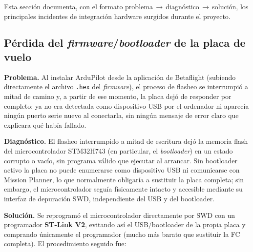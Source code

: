 Esta sección documenta, con el formato problema\,$\rightarrow$\,diagnóstico\,$\rightarrow$\,solución, los principales incidentes de integración hardware surgidos durante el proyecto.

\subsection{Pérdida del \textit{firmware}/\textit{bootloader} de la placa de vuelo}
\label{sec:problema-stlink}

\textbf{Problema.} Al instalar ArduPilot desde la aplicación de Betaflight (subiendo directamente el archivo \texttt{.hex} del \textit{firmware}), el proceso de flasheo se interrumpió a mitad de camino y, a partir de ese momento, la placa dejó de responder por completo: ya no era detectada como dispositivo USB por el ordenador ni aparecía ningún puerto serie nuevo al conectarla, sin ningún mensaje de error claro que explicara qué había fallado.

\textbf{Diagnóstico.} El flasheo interrumpido a mitad de escritura dejó la memoria flash del microcontrolador STM32H743 (en particular, el \textit{bootloader}) en un estado corrupto o vacío, sin programa válido que ejecutar al arrancar. Sin bootloader activo la placa no puede enumerarse como dispositivo USB ni comunicarse con Mission Planner, lo que normalmente obligaría a sustituir la placa completa; sin embargo, el microcontrolador seguía físicamente intacto y accesible mediante su interfaz de depuración SWD, independiente del USB y del bootloader.

\textbf{Solución.} Se reprogramó el microcontrolador directamente por SWD con un programador \textbf{ST-Link V2}, evitando así el USB/bootloader de la propia placa y comprando únicamente el programador (mucho más barato que sustituir la FC completa). El procedimiento seguido fue:

